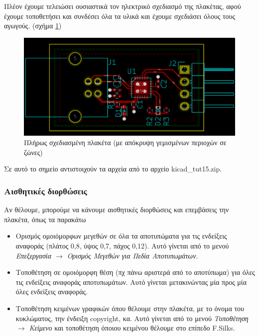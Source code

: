 \documentclass[a4paper]{article}
\begin{document}
Πλέον έχουμε τελειώσει ουσιαστικά τον ηλεκτρικό σχεδιασμό της πλακέτας, αφού έχουμε τοποθετήσει και συνδέσει όλα τα υλικά και έχουμε σχεδιάσει όλους τους αγωγούς. (σχήμα \ref{fig:pcb-circ-final})

\begin{figure}
  \begin{center}
    \includegraphics[width=.9\textwidth]{img/pcb-circ-final.png}
    \caption{Πλήρως σχεδιασμένη πλακέτα (με απόκρυψη γεμισμένων περιοχών σε ζώνες)}
    \label{fig:pcb-circ-final}
  \end{center}
\end{figure}

Σε αυτό το σημείο αντιστοιχούν τα αρχεία από το αρχείο kicad\_tut15.zip.

\subsubsection{Αισθητικές διορθώσεις}

Αν θέλουμε, μπορούμε να κάνουμε αισθητικές διορθώσεις και επεμβάσεις την πλακέτα, όπως τα παρακάτω
\begin{itemize}
    \item Ορισμός ομοιόμορφων μεγεθών σε όλα τα αποτυπώματα για τις ενδείξεις αναφοράς (πλάτος 0,8, ύψος 0,7, πάχος 0,12). Αυτό γίνεται από το μενού \textit{Επεξεργασία $\rightarrow$ Ορισμός Μεγεθών για Πεδία Αποτυπωμάτων}.
    \item Τοποθέτηση σε ομοιόμορφη θέση (πχ πάνω αριστερά από το αποτύπωμα) για όλες τις ενδείξεις αναφοράς αποτυπωμάτων. Αυτό γίνεται μετακινώντας μία προς μία όλες ενδείξεις αναφοράς.
    \item Τοποθέτηση κειμένων γραφικών όπου θέλουμε στην πλακέτα, με το όνομα του κυκλώματος, την ένδειξη copyright, κα. Αυτό γίνεται από το μενού \textit{Τοποθέτηση $\rightarrow$ Κείμενο} και τοποθέτηση όποιου κειμένου θέλουμε στο επίπεδο F.Silks.
\end{itemize}
\end{document}
